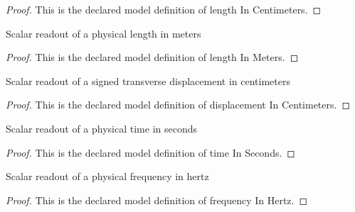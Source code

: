 \begin{proof}
  This is the declared model definition of length In Centimeters.
\end{proof}
\begin{definition}
  \label{def:physics:phyx-mini-0166:phyxminiproblems-problemphyxmini0166-lengthinmeters}
  Scalar readout of a physical length in meters
\end{definition}
\begin{proof}
  This is the declared model definition of length In Meters.
\end{proof}
\begin{definition}
  \label{def:physics:phyx-mini-0166:phyxminiproblems-problemphyxmini0166-displacementincentimeters}
  Scalar readout of a signed transverse displacement in centimeters
\end{definition}
\begin{proof}
  This is the declared model definition of displacement In Centimeters.
\end{proof}
\begin{definition}
  \label{def:physics:phyx-mini-0166:phyxminiproblems-problemphyxmini0166-timeinseconds}
  Scalar readout of a physical time in seconds
\end{definition}
\begin{proof}
  This is the declared model definition of time In Seconds.
\end{proof}
\begin{definition}
  \label{def:physics:phyx-mini-0166:phyxminiproblems-problemphyxmini0166-frequencyinhertz}
  Scalar readout of a physical frequency in hertz
\end{definition}
\begin{proof}
  This is the declared model definition of frequency In Hertz.
\end{proof}
